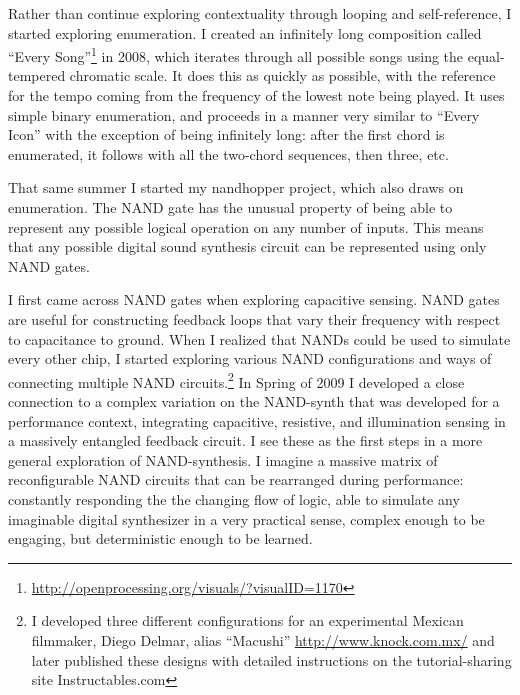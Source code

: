 \documentclass{thesis}
\begin{document}
Rather than continue exploring contextuality through looping and self-reference, I started exploring enumeration. I created an infinitely long composition called ``Every Song''\footnote{\url{http://openprocessing.org/visuals/?visualID=1170}} in 2008, which iterates through all possible songs using the equal-tempered chromatic scale. It does this as quickly as possible, with the reference for the tempo coming from the frequency of the lowest note being played. It uses simple binary enumeration, and proceeds in a manner very similar to ``Every Icon'' with the exception of being infinitely long: after the first chord is enumerated, it follows with all the two-chord sequences, then three, etc.

That same summer I started my nandhopper project\cite{kyle_mcdonald_nandhopper_2008}, which also draws on enumeration. The NAND gate has the unusual property of being able to represent any possible logical operation on any number of inputs. This means that any possible digital sound synthesis circuit can be represented using only NAND gates.
	
I first came across NAND gates when exploring capacitive sensing. NAND gates are useful for constructing feedback loops that vary their frequency with respect to capacitance to ground. When I realized that NANDs could be used to simulate every other chip, I started exploring various NAND configurations and ways of connecting multiple NAND circuits.\footnote{I developed three different configurations for an experimental Mexican filmmaker, Diego Delmar, alias ``Macushi'' \url{http://www.knock.com.mx/} and later published these designs with detailed instructions on the tutorial-sharing site Instructables.com} In Spring of 2009 I developed a close connection to a complex variation on the NAND-synth that was developed for a performance context, integrating capacitive, resistive, and illumination sensing in a massively entangled feedback circuit. I see these as the first steps in a more general exploration of NAND-synthesis. I imagine a massive matrix of reconfigurable NAND circuits that can be rearranged during performance: constantly responding the the changing flow of logic, able to simulate any imaginable digital synthesizer in a very practical sense, complex enough to be engaging, but deterministic enough to be learned.
\end{document}
